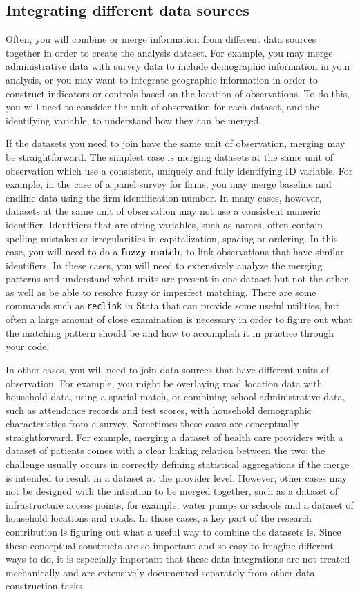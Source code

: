 \subsection{Integrating different data sources}
Often, you will combine or merge information from different data sources together
in order to create the analysis dataset.
For example, you may merge administrative data with survey data
to include demographic information in your analysis,
or you may want to integrate geographic information
in order to construct indicators or controls based on the location of observations.
To do this, you will need to consider the unit of observation for each dataset,
and the identifying variable, to understand how they can be merged.

If the datasets you need to join have the same unit of observation,
merging may be straightforward.
The simplest case is merging datasets at the same unit of observation
which use a consistent, uniquely and fully identifying ID variable. 
For example, in the case of a panel survey for firms,
you may merge baseline and endline data using the firm identification number.
In many cases, however, 
datasets at the same unit of observation may not use a consistent numeric identifier.
Identifiers that are string variables, such as names, 
often contain spelling mistakes or irregularities in capitalization, spacing or ordering. 
In this case, you will need to do a \textbf{fuzzy match}, 
to link observations that have similar identifiers. 
In these cases, you will need to extensively analyze the merging patterns
and understand what units are present in one dataset but not the other,
as well as be able to resolve fuzzy or imperfect matching.
There are some commands such as \texttt{reclink} in Stata
that can provide some useful utilities,
but often a large amount of close examination is necessary
in order to figure out what the matching pattern should be
and how to accomplish it in practice through your code.

In other cases, you will need to join data sources that have different units of observation.
For example, you might be overlaying road location data with household data,
using a spatial match,
or combining school administrative data, such as attendance records and test scores,
with household demographic characteristics from a survey.
Sometimes these cases are conceptually straightforward.
For example, merging a dataset of health care providers
with a dataset of patients comes with a clear linking relation between the two;
the challenge usually occurs in correctly defining statistical aggregations
if the merge is intended to result in a dataset at the provider level.
However, other cases may not be designed with the intention to be merged together,
such as a dataset of infrastructure access points, for example, water pumps or schools
and a dataset of household locations and roads.
In those cases, a key part of the research contribution is figuring out what
a useful way to combine the datasets is.
Since these conceptual constructs are so important
and so easy to imagine different ways to do,
it is especially important that these data integrations are not treated mechanically
and are extensively documented separately from other data construction tasks.

